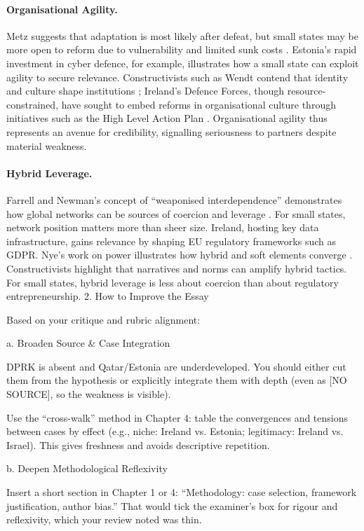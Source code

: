 \paragraph{Organisational Agility.}  
Metz suggests that adaptation is most likely after defeat, but small states may be more open to reform due to vulnerability and limited sunk costs \parencite{METZ_2007}. Estonia’s rapid investment in cyber defence, for example, illustrates how a small state can exploit agility to secure relevance. Constructivists such as Wendt contend that identity and culture shape institutions \parencite{WENDT_1999}; Ireland’s Defence Forces, though resource-constrained, have sought to embed reforms in organisational culture through initiatives such as the High Level Action Plan \parencite{HLAP_2022}. Organisational agility thus represents an avenue for credibility, signalling seriousness to partners despite material weakness.

\paragraph{Hybrid Leverage.}  
Farrell and Newman’s concept of “weaponised interdependence” demonstrates how global networks can be sources of coercion and leverage \parencite{FARRELL_2019}. For small states, network position matters more than sheer size. Ireland, hosting key data infrastructure, gains relevance by shaping EU regulatory frameworks such as GDPR. Nye’s work on power illustrates how hybrid and soft elements converge \parencite{NYE_2008}. Constructivists highlight that narratives and norms can amplify hybrid tactics. For small states, hybrid leverage is less about coercion than about regulatory entrepreneurship.
2. How to Improve the Essay

Based on your critique and rubric alignment:

a. Broaden Source \& Case Integration

DPRK is absent and Qatar/Estonia are underdeveloped. You should either cut them from the hypothesis or explicitly integrate them with depth (even as [NO SOURCE], so the weakness is visible).

Use the “cross-walk” method in Chapter 4: table the convergences and tensions between cases by effect (e.g., niche: Ireland vs. Estonia; legitimacy: Ireland vs. Israel). This gives freshness and avoids descriptive repetition.

b. Deepen Methodological Reflexivity

Insert a short section in Chapter 1 or 4: “Methodology: case selection, framework justification, author bias.” That would tick the examiner’s box for rigour and reflexivity, which your review noted was thin.

